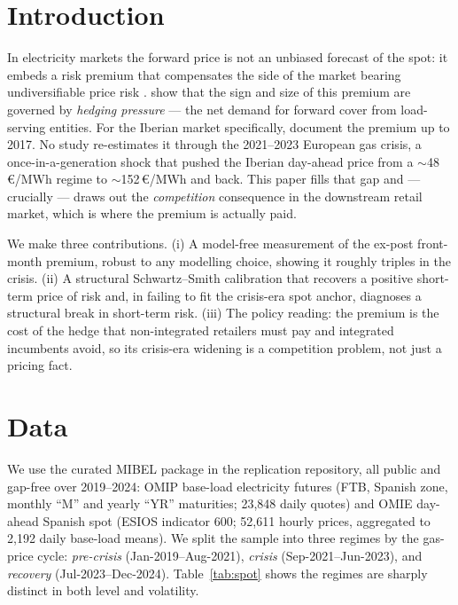 \documentclass[11pt,a4paper]{article}
\begin{document}
\section{Introduction}

In electricity markets the forward price is not an unbiased forecast of the spot:
it embeds a risk premium that compensates the side of the market bearing
undiversifiable price risk \citep{bessembinder2002,luciaschwartz2002,longstaffwang2004}.
\citet{bessembinder2002} show that the sign and size of this premium are governed
by \emph{hedging pressure} --- the net demand for forward cover from
load-serving entities. For the Iberian market specifically, \citet{ferreira2018}
document the premium up to 2017. No study re-estimates it through the
2021--2023 European gas crisis, a once-in-a-generation shock that pushed the
Iberian day-ahead price from a $\sim$48\,\euro/MWh regime to $\sim$152\,\euro/MWh
and back. This paper fills that gap and --- crucially --- draws out the
\emph{competition} consequence in the downstream retail market, which is where the
premium is actually paid.

We make three contributions. (i) A model-free measurement of the ex-post
front-month premium, robust to any modelling choice, showing it roughly triples in
the crisis. (ii) A structural Schwartz--Smith calibration that recovers a positive
short-term price of risk and, in failing to fit the crisis-era spot anchor,
diagnoses a structural break in short-term risk. (iii) The policy reading: the
premium is the cost of the hedge that non-integrated retailers must pay and
integrated incumbents avoid, so its crisis-era widening is a competition problem,
not just a pricing fact.

\section{Data}

We use the curated MIBEL package in the replication repository, all public and
gap-free over 2019--2024: OMIP base-load electricity futures (FTB, Spanish zone,
monthly ``M'' and yearly ``YR'' maturities; 23{,}848 daily quotes) and OMIE
day-ahead Spanish spot (ESIOS indicator 600; 52{,}611 hourly prices, aggregated
to 2{,}192 daily base-load means). We split the sample into three regimes by the
gas-price cycle: \emph{pre-crisis} (Jan-2019--Aug-2021), \emph{crisis}
(Sep-2021--Jun-2023), and \emph{recovery} (Jul-2023--Dec-2024). Table~\ref{tab:spot}
shows the regimes are sharply distinct in both level and volatility.
\end{document}
